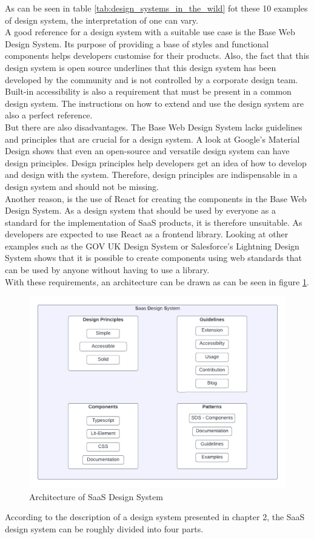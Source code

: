 As can be seen in table \ref{tab:design_systems_in_the_wild} fot these 10 examples of design system, the interpretation of one can vary. \\
A good reference for a design system with a suitable use case is the Base Web Design System. Its purpose of providing a base of styles and functional components helps developers customise for their products. Also, the fact that this design system is open source underlines that this design system has been developed by the community and is not controlled by a corporate design team. Built-in accessibility is also a requirement that must be present in a common design system. The instructions on how to extend and use the design system are also a perfect reference. \\
But there are also disadvantages. The Base Web Design System lacks guidelines and principles that are crucial for a design system. A look at Google's Material Design shows that even an open-source and versatile design system can have design principles. Design principles help developers get an idea of how to develop and design with the system. Therefore, design principles are indispensable in a design system and should not be missing. \\ \newpage
Another reason, is the use of React for creating the components in the Base Web Design System. As a design system that should be used by everyone as a standard for the implementation of SaaS products, it is therefore unsuitable. As developers are expected to use React as a frontend library. Looking at other examples such as the GOV UK Design System or Salesforce's Lightning Design System shows that it is possible to create components using web standards that can be used by anyone without having to use a library. \\
With these requirements, an architecture can be drawn as can be seen in figure \ref{architecture_sds}. \\
\begin{figure}[htbp]
\centerline{\includegraphics[width=\linewidth]{images/architecture_sds.png}}
\caption{Architecture of SaaS Design System}
\label{architecture_sds}
\end{figure}
According to the description of a design system presented in chapter 2, the SaaS design system can be roughly divided into four parts. \\

